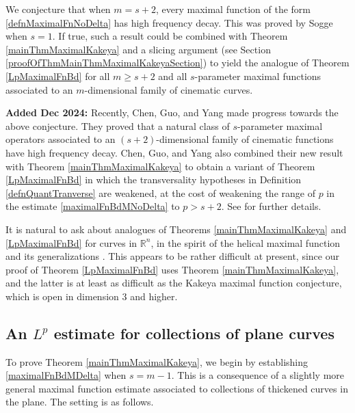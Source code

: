 \documentclass[letterpaper, reqno,11pt]{article}
\numberwithin{equation}{section}
\newcommand{\RR}{\mathbb{R}}
\numberwithin{thm}{section}
\theoremstyle{remark}
\begin{document}
We conjecture that when $m=s+2$, every maximal function of the form \eqref{defnMaximalFnNoDelta} has high frequency decay. This was proved by Sogge \cite{Sogge} when $s=1$. If true, such a result could be combined with Theorem \ref{mainThmMaximalKakeya} and a slicing argument (see Section \ref{proofOfThmMainThmMaximalKakeyaSection}) to yield the analogue of Theorem \ref{LpMaximalFnBd} for all $m\geq s+2$ and all $s$-parameter maximal functions associated to an $m$-dimensional family of cinematic curves.

\medskip

{\bf Added Dec 2024:} Recently, Chen, Guo, and Yang \cite{CGYv6} made progress towards the above conjecture. They proved that a natural class of $s$-parameter maximal operators associated to an $(s+2)$-dimensional family of cinematic functions have high frequency decay. Chen, Guo, and Yang \cite{CGYv6} also combined their new result with Theorem \ref{mainThmMaximalKakeya} to obtain a variant of Theorem \ref{LpMaximalFnBd} in which the transversality hypotheses in Definition \ref{defnQuantTranverse} are weakened, at the cost of weakening the range of $p$ in the estimate \eqref{maximalFnBdMNoDelta} to $p>s+2$. See \cite{CGYv6} for further details.


\medskip



It is natural to ask about analogues of Theorems \ref{mainThmMaximalKakeya} and \ref{LpMaximalFnBd} for curves in $\RR^n$, in the spirit of the helical maximal function and its generalizations \cite{BGHS, KSO, KSO2}. This appears to be rather difficult at present, since our proof of Theorem \ref{LpMaximalFnBd} uses Theorem \ref{mainThmMaximalKakeya}, and the latter is at least as difficult as the Kakeya maximal function conjecture, which is open in dimension 3 and higher.


\subsection{An $L^p$ estimate for collections of plane curves}

To prove Theorem \ref{mainThmMaximalKakeya}, we begin by establishing \eqref{maximalFnBdMDelta} when $s=m-1$. This is a consequence of a slightly more general maximal function estimate associated to collections of thickened curves in the plane. The setting is as follows.
\end{document}
